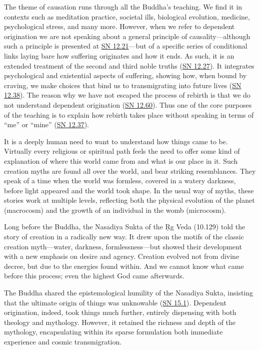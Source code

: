 \documentclass[12pt,openany]{book}%
\begin{document}
The theme of causation runs through all the Buddha’s teaching. We find it in contexts such as meditation practice, societal ills, biological evolution, medicine, psychological stress, and many more. However, when we refer to dependent origination we are not speaking about a general principle of causality—although such a principle is presented at \href{https://suttacentral.net/sn12.21}{SN 12.21}—but of a specific series of conditional links laying bare how suffering originates and how it ends. As such, it is an extended treatment of the second and third noble truths (\href{https://suttacentral.net/sn12.27}{SN 12.27}). It integrates psychological and existential aspects of suffering, showing how, when bound by craving, we make choices that bind us to transmigrating into future lives (\href{https://suttacentral.net/sn12.38}{SN 12.38}). The reason why we have not escaped the process of rebirth is that we do not understand dependent origination (\href{https://suttacentral.net/sn12.60}{SN 12.60}). Thus one of the core purposes of the teaching is to explain how rebirth takes place without speaking in terms of “me” or “mine” (\href{https://suttacentral.net/sn12.37}{SN 12.37}).

It is a deeply human need to want to understand how things came to be. Virtually every religious or spiritual path feels the need to offer some kind of explanation of where this world came from and what is our place in it. Such creation myths are found all over the world, and bear striking resemblances. They speak of a time when the world was formless, covered in a watery darkness, before light appeared and the world took shape. In the usual way of myths, these stories work at multiple levels, reflecting both the physical evolution of the planet (macrocosm) and the growth of an individual in the womb (microcosm).

Long before the Buddha, the Nasadiya Sukta of the Ṛg Veda (10.129) told the story of creation in a radically new way. It drew upon the motifs of the classic creation myth—water, darkness, formlessness—but showed their development with a new emphasis on desire and agency. Creation evolved not from divine decree, but due to the energies found within. And we cannot know what came before this process; even the highest God came afterwards.

The Buddha shared the epistemological humility of the Nasadiya Sukta, insisting that the ultimate origin of things was unknowable (\href{https://suttacentral.net/sn15.1}{SN 15.1}). Dependent origination, indeed, took things much further, entirely dispensing with both theology and mythology. However, it retained the richness and depth of the mythology, encapsulating within its sparse formulation both immediate experience and cosmic transmigration.
\end{document}

